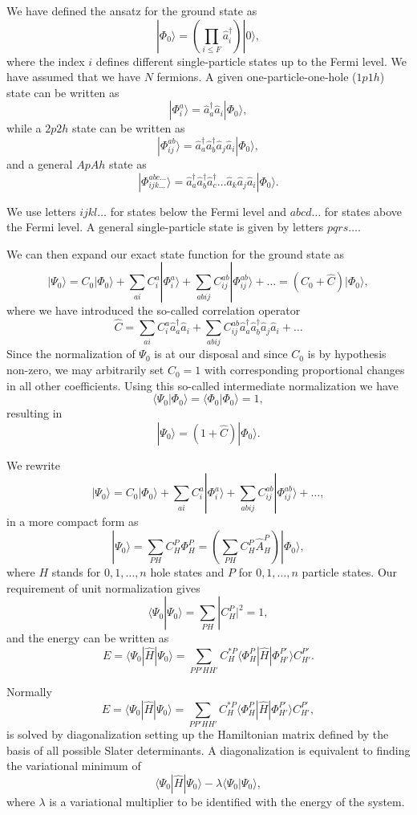We have defined the ansatz for the ground state as 
\[
|\Phi_0\rangle = \left(\prod_{i\le F}\hat{a}_{i}^{\dagger}\right)|0\rangle,
\]
where the index $i$ defines different single-particle states up to the Fermi level. We have assumed that we have $N$ fermions. 
A given one-particle-one-hole ($1p1h$) state can be written as
\[
|\Phi_i^a\rangle = \hat{a}_{a}^{\dagger}\hat{a}_i|\Phi_0\rangle,
\]
while a $2p2h$ state can be written as
\[
|\Phi_{ij}^{ab}\rangle = \hat{a}_{a}^{\dagger}\hat{a}_{b}^{\dagger}\hat{a}_j\hat{a}_i|\Phi_0\rangle,
\]
and a general $ApAh$ state as 
\[
|\Phi_{ijk\dots}^{abc\dots}\rangle = \hat{a}_{a}^{\dagger}\hat{a}_{b}^{\dagger}\hat{a}_{c}^{\dagger}\dots\hat{a}_k\hat{a}_j\hat{a}_i|\Phi_0\rangle.
\]

We use letters $ijkl\dots$ for states below the Fermi level and $abcd\dots$ for states above the Fermi level. A general single-particle state is given by letters $pqrs\dots$.

We can then expand our exact state function for the ground state 
as
\[
|\Psi_0\rangle=C_0|\Phi_0\rangle+\sum_{ai}C_i^a|\Phi_i^a\rangle+\sum_{abij}C_{ij}^{ab}|\Phi_{ij}^{ab}\rangle+\dots
=(C_0+\hat{C})|\Phi_0\rangle,
\]
where we have introduced the so-called correlation operator 
\[
\hat{C}=\sum_{ai}C_i^a\hat{a}_{a}^{\dagger}\hat{a}_i  +\sum_{abij}C_{ij}^{ab}\hat{a}_{a}^{\dagger}\hat{a}_{b}^{\dagger}\hat{a}_j\hat{a}_i+\dots
\]
Since the normalization of $\Psi_0$ is at our disposal and since $C_0$ is by hypothesis non-zero, we may arbitrarily set $C_0=1$ with 
corresponding proportional changes in all other coefficients. Using this so-called intermediate normalization we have
\[
\langle \Psi_0 | \Phi_0 \rangle = \langle \Phi_0 | \Phi_0 \rangle = 1, 
\]
resulting in 
\[
|\Psi_0\rangle=(1+\hat{C})|\Phi_0\rangle.
\]


We rewrite 
\[
|\Psi_0\rangle=C_0|\Phi_0\rangle+\sum_{ai}C_i^a|\Phi_i^a\rangle+\sum_{abij}C_{ij}^{ab}|\Phi_{ij}^{ab}\rangle+\dots,
\]
in a more compact form as 
\[
|\Psi_0\rangle=\sum_{PH}C_H^P\Phi_H^P=\left(\sum_{PH}C_H^P\hat{A}_H^P\right)|\Phi_0\rangle,
\]
where $H$ stands for $0,1,\dots,n$ hole states and $P$ for $0,1,\dots,n$ particle states. 
Our requirement of unit normalization gives
\[
\langle \Psi_0 | \Psi_0 \rangle = \sum_{PH}|C_H^P|^2= 1,
\]
and the energy can be written as 
\[
E= \langle \Psi_0 | \hat{H} |\Psi_0 \rangle= \sum_{PP'HH'}C_H^{*P}\langle \Phi_H^P | \hat{H} |\Phi_{H'}^{P'} \rangle C_{H'}^{P'}.
\]


Normally 
\[
E= \langle \Psi_0 | \hat{H} |\Psi_0 \rangle= \sum_{PP'HH'}C_H^{*P}\langle \Phi_H^P | \hat{H} |\Phi_{H'}^{P'} \rangle C_{H'}^{P'},
\]
is solved by diagonalization setting up the Hamiltonian matrix defined by the basis of all possible Slater determinants. A diagonalization
is equivalent to finding the variational minimum   of 
\[
 \langle \Psi_0 | \hat{H} |\Psi_0 \rangle-\lambda \langle \Psi_0 |\Psi_0 \rangle,
\]
where $\lambda$ is a variational multiplier to be identified with the energy of the system.

